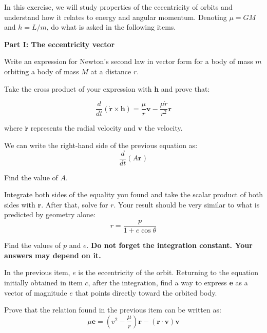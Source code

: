 \documentclass[11pt]{article}
\begin{document}
\begin{pproblem}
    In this exercise, we will study properties of the eccentricity of orbits and understand how it relates to energy and angular momentum. Denoting \(\mu = GM\) and \(h=L/m\), do what is asked in the following items.
    \begin{center}
        \textbf{Part I: The eccentricity vector}
    \end{center}
    \begin{alternativas}
        \item Write an expression for Newton's second law in vector form for a body of mass \(m\) orbiting a body of mass \(M\) at a distance \(r\).
        
        \item Take the cross product of your expression with \(\mathbf{h}\) and prove that:
        
        \[\frac{d}{dt}(\dot{\mathbf{r}}\times \mathbf{h}) = \frac{\mu}{r}\mathbf{v} - \frac{\mu \dot{r}}{r^2}\mathbf{r}\]

        where \(\dot{\mathbf{r}}\) represents the radial velocity and \(\mathbf{v}\) the velocity.

        \item We can write the right-hand side of the previous equation as:
        \[\frac{d}{dt}\left(A\mathbf{r}\right)\]

        Find the value of \(A\).

        \item Integrate both sides of the equality you found and take the scalar product of both sides with \(\mathbf{r}\). After that, solve for \(r\). Your result should be very similar to what is predicted by geometry alone:
        \[r = \frac{p}{1+e\cos\theta}\]

        Find the values of \(p\) and \(e\). \textbf{Do not forget the integration constant. Your answers may depend on it.}

        \item In the previous item, \(e\) is the eccentricity of the orbit. Returning to the equation initially obtained in item \(c\), after the integration, find a way to express \(\mathbf{e}\) as a vector of magnitude \(e\) that points directly toward the orbited body.
        
        \item Prove that the relation found in the previous item can be written as:
        \[\mu \mathbf{e} = (v^2-\frac{\mu}{r})\mathbf{r} - (\mathbf{r}\cdot\mathbf{v})\mathbf{v}\]


\end{alternativas}
\end{pproblem}
\end{document}
